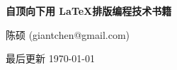 \thispagestyle{empty}
\begin{center}
  {\LARGE\textbf{自顶向下用 \LaTeX 排版编程技术书籍}}

  \vspace{1em}
  {\large 陈硕 (giantchen@gmail.com)}

  \vspace{1ex}
  最后更新 \today
\end{center}


